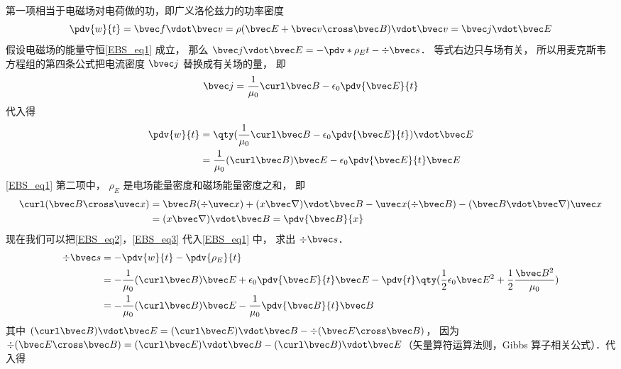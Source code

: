 第一项相当于电磁场对电荷做的功，即广义洛伦兹力的功率密度
\begin{equation}
\pdv{w}{t} = \bvec f \vdot \bvec v = \rho (\bvec E + \bvec v \cross \bvec B) \vdot \bvec v = \bvec j \vdot \bvec E
\end{equation} 
假设电磁场的能量守恒\autoref{EBS_eq1} 成立， 那么 $\bvec j \vdot \bvec E =  - \pdv*{\rho_E}{t} - \div \bvec s$． 等式右边只与场有关， 所以用麦克斯韦方程组的第四条公式把电流密度 $\bvec j$ 替换成有关场的量， 即
\begin{equation}
\bvec j = \frac{1}{\mu_0} \curl \bvec B - \epsilon_0 \pdv{\bvec E}{t}
\end{equation} 
代入得
\begin{equation}\label{EBS_eq2}
\begin{aligned}
\pdv{w}{t} &= \qty(\frac{1}{\mu_0} \curl \bvec B - \epsilon_0 \pdv{\bvec E}{t}) \vdot \bvec E\\
&= \frac{1}{\mu_0} (\curl \bvec B)\bvec E - \epsilon_0 \pdv{\bvec E}{t} \bvec E
\end{aligned}
\end{equation} 
\autoref{EBS_eq1} 第二项中， $\rho_E$ 是电场能量密度和磁场能量密度之和， 即
\begin{equation}\label{EBS_eq3}
\begin{aligned}
\curl (\bvec B \cross \uvec x) &= \bvec B(\div \uvec x) + (x\bvec\nabla) \vdot\bvec B - \uvec x( \div \bvec B) - (\bvec B\vdot\bvec\nabla)\uvec x \\
&= (x\bvec\nabla)\vdot\bvec B = \pdv{\bvec B}{x}
\end{aligned}\end{equation} 
现在我们可以把\autoref{EBS_eq2}，\autoref{EBS_eq3} 代入\autoref{EBS_eq1} 中， 求出 $\div \bvec s$． 
\begin{equation}
\begin{aligned}
\div \bvec s &=  - \pdv{w}{t} - \pdv{\rho_E}{t}\\
&= -\frac{1}{\mu_0} (\curl \bvec B)\bvec E + \epsilon_0 \pdv{\bvec E}{t} \bvec E - \pdv{t} \qty( \frac12 \epsilon_0 \bvec E^2 + \frac12 \frac{\bvec B^2}{\mu_0} )\\
&=  - \frac{1}{\mu_0} (\curl \bvec B)\bvec E - \frac{1}{\mu_0} \pdv{\bvec B}{t}\bvec B
\end{aligned}
\end{equation} 
其中 $(\curl \bvec B) \vdot \bvec E = (\curl \bvec E) \vdot \bvec B - \div (\bvec E \cross \bvec B)$， 因为 $\div (\bvec E \cross \bvec B) = (\curl \bvec E) \vdot \bvec B - (\curl \bvec B) \vdot \bvec E$（矢量算符运算法则，Gibbs 算子相关公式）．代入得
